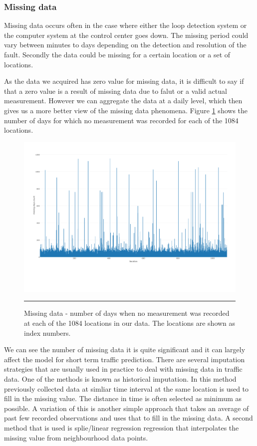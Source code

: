 \subsubsection{Missing data}
Missing data occurs often in the case where either the loop detection system or the computer system
at the control center goes down. The missing period could vary between minutes to days depending on
the detection and resolution of the fault. Secondly the data could be missing for a certain location
or a set of locations.


As the data we acquired has zero value for missing data, it is difficult to say if that a zero value
is a result of missing data due to falut or a valid actual measurement. However we can aggregate the
data at a daily level, which then gives us a more better view of the missing data phenomena. Figure
\ref{fig:missing-days-count} shows the number of days for which no measurement was recorded for each
of the 1084 locations.

\begin{figure}[htbp]
  \centering
    \includegraphics[width=\textwidth,height=\textheight,keepaspectratio]{Figures/missing-days-count.pdf}
    \rule{35em}{0.5pt}
  \caption[Missing data]{Missing data - number of days when no measurement was recorded at each of
  the 1084 locations in our data. The locations are shown as index numbers.}
  \label{fig:missing-days-count}
\end{figure}

We can see the number of missing data it is quite significant and it can largely affect the model for
short term traffic prediction. There are several imputation strategies that are usually used in practice
to deal with missing data in traffic data. One of the methods is known as historical imputation. In this
method previously collected data at simliar time interval at the same location is used to fill in the missing
value. The distance in time is often selected as minimum as possible. A variation of this is another
simple approach that takes an average of past few recorded observations and uses that to fill in
the missing data. A second method that is used is splie/linear regression regression that interpolates
the missing value from neighbourhood data points.


